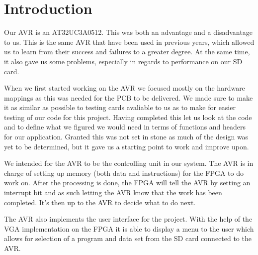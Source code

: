 \section{Introduction}

Our AVR is an AT32UC3A0512. This was both an advantage and a disadvantage to us. This is the same AVR that have been used in previous years, which allowed us to learn from their success and failures to a greater degree. At the same time, it also gave us some problems, especially in regards to performance on our SD card. 

When we first started working on the AVR we focused mostly on the hardware mappings as this was needed for the PCB to be delivered. We made sure to make it as similar as possible to testing cards avaliable to us as to make for easier testing of our code for this project. Having completed this let us look at the code and to define what we figured we would need in terms of functions and headers for our application. Granted this was not set in stone as much of the design was yet to be determined, but it gave us a starting point to work and improve upon.

We intended for the AVR to be the controlling unit in our system. The AVR is in charge of setting up memory (both data and instructions) for the FPGA to do work on. After the processing is done, the FPGA will tell the AVR by setting an interrupt bit and as such letting the AVR know that the work has been completed. It's then up to the AVR to decide what to do next. 

The AVR also implements the user interface for the project. With the help of the VGA implementation on the FPGA it is able to display a menu to the user which allows for selection of a program and data set from the SD card connected to the AVR.

